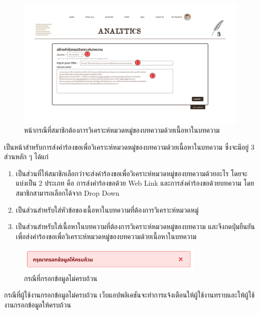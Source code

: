 \documentclass[12pt,oneside,openright,a4paper]{cpe-thai-project}
\begin{document}
\begin{itemize}
\begin{figure}[!ht]
  \includegraphics[width=16cm]{./img/project_ui/content.png} 
  \caption{หน้ากรณีที่สมาชิกต้องการวิเคราะห์หมวดหมู่ของบทความด้วยเนื้อหาในบทความ}\label{fig:raw_content} 
\end{figure}
\hspace*{1cm}เป็นหน้าสำหรับการส่งคำร้องขอเพื่อวิเคราะห์หมวดหมู่ของบทความด้วยเนื้อหาในบทความ ซึ่งจะมีอยู่ 3 ส่วนหลัก ๆ ได้แก่
\begin{enumerate}
  \item เป็นส่วนที่ให้สมาชิกเลือกว่าจะส่งคำร้องขอเพื่อวิเคราะห์หมวดหมู่ของบทความด้วยอะไร โดยจะแบ่งเป็น 2 ประเภท คือ 
        การส่งคำร้องขอด้วย Web Link และการส่งคำร้องขอด้วยบทความ โดยสมาชิกสามารถเลือกได้จาก Drop Down
  \item เป็นส่วนสำหรับใส่หัวข้อของเนื้อหาในบทความที่ต้องการวิเคราะห์หมวดหมู่
  \item เป็นส่วนสำหรับใส่เนื้อหาในบทความที่ต้องการวิเคราะห์หมวดหมู่ของบทความ และจึงกดปุ่มยืนยันเพื่อส่งคำร้องขอเพื่อวิเคราะห์หมวดหมู่ของบทความด้วยเนื้อหาในบทความ
\end{enumerate}
\begin{figure}[!ht]\centering
  \includegraphics[width=9cm]{./img/project_ui/all_inform.png} 
  \caption{กรณีที่กรอกข้อมูลไม่ครบถ้วน}\label{fig:cont_info} 
\end{figure}
\hspace*{1cm}กรณีที่ผู้ใช้งานกรอกข้อมูลไม่ครบถ้วน เว็บแอปพลิเคชันจะทำการแจ้งเตือนให้ผู้ใช้งานทราบและให้ผู้ใช้งานกรอกข้อมูลให้ครบถ้วน \newpage


\end{itemize}
\end{document}
